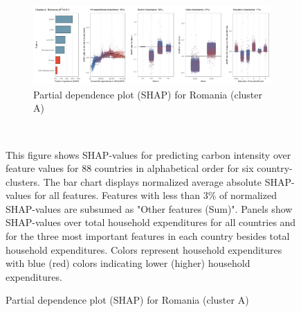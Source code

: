 \begin{figure}[ht!]
    \\
    \vspace{0.5cm}
   \begin{subfigure}[b]{\textwidth}
         \centering
         \caption{Partial dependence plot (SHAP) for Romania (cluster A)}
         \label{fig:5b_ROU}
         \includegraphics[width=\textwidth]{Figure 5b/Figure_5b_ROU}
         \end{subfigure}
    \\
    \vspace{0.5cm}
   
    \begin{subcaption2}
     This figure shows SHAP-values for predicting carbon intensity over feature values for 88 countries in alphabetical order for six country-clusters. The bar chart displays normalized average absolute SHAP-values for all features. Features with less than 3\% of normalized SHAP-values are subsumed as "Other features (Sum)". Panels show SHAP-values over total household expenditures for all countries and for the three most important features in each country besides total household expenditures. Colors represent household expenditures with blue (red) colors indicating lower (higher) household expenditures.
     \end{subcaption2}
\end{figure}

